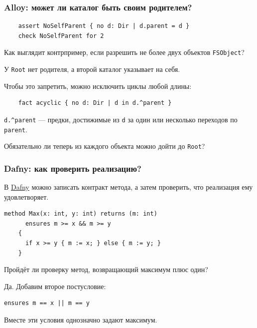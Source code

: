 \documentclass[11pt]{beamer}
\begin{document}
\begin{frame}[fragile]
  \frametitle{Alloy: может ли каталог быть своим родителем?}
  \small
  \begin{verbatim}
    assert NoSelfParent { no d: Dir | d.parent = d }
    check NoSelfParent for 2
  \end{verbatim}
  Как выглядит контрпример, если разрешить не более двух объектов \texttt{FSObject}?
  \pause\par\medskip
  У \texttt{Root} нет родителя, а второй каталог указывает на себя.
  \pause\par
  Чтобы это запретить, можно исключить циклы любой длины:
  \begin{verbatim}
    fact acyclic { no d: Dir | d in d.^parent }
  \end{verbatim}
  \texttt{d.^parent} — предки, достижимые из \texttt{d} за один или несколько переходов по \texttt{parent}.
  \pause\par Обязательно ли теперь из каждого объекта можно дойти до \texttt{Root}?
\end{frame}

\begin{frame}[fragile]
  \frametitle{Dafny: как проверить реализацию?}
  \small В \href{https://dafny.org/}{Dafny} можно записать контракт метода, а затем проверить, что реализация ему удовлетворяет.
  \begin{lstlisting}[style=specification,basicstyle=\footnotesize\ttfamily,morekeywords={method,returns,ensures,if,else},morekeywords={[2]int}]
    method Max(x: int, y: int) returns (m: int)
      ensures m >= x && m >= y
    {
      if x >= y { m := x; } else { m := y; }
    }
  \end{lstlisting}
  Пройдёт ли проверку метод, возвращающий максимум плюс один?
  \pause\par Да. Добавим второе постусловие:
  \begin{lstlisting}[style=specification,basicstyle=\footnotesize\ttfamily,morekeywords={ensures}]
    ensures m == x || m == y
  \end{lstlisting}
  Вместе эти условия однозначно задают максимум.
\end{frame}
\end{document}
